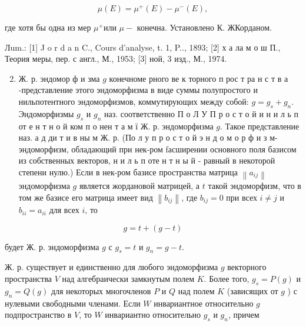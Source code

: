 \documentclass[10pt]{article}
\begin{document}
\[

\mu(E)=\mu^{+}(E)-\mu^{-}(E),

\]



где хотя бы одна из мер $\mu^{+}$или $\mu-$ конечна. Установлено К. ЖКорданом.



Лum.: [1] J o r d a n C., Cours d'analyse, t. 1, P.., 1893; [2] х а ла м о ш П., Теория меры, пер. с англ., М., 1953; [3] ной, 3 изд., М., 1974.



\begin{enumerate}

  \setcounter{enumi}{1}

  \item Ж. р. эндомор ф и зма $g$ конечноме рного ве к торного п рос т ра н с т в а -представление этого эндоморфизма в виде суммы полупростого и нильпотентного эндоморфизмов, коммутирующих между собой: $g=g_{s}+g_{n}$. Эндоморфизмы $g_{s}$ и $g_{n}$ наз. соответственно П о Л У П р о с т о й и н и л ь п от е н т н о й ком п о нен т а м ї Ж. р. эндоморфизма $g$. Такое представление наз. а д ди т и в ны м Ж. р. (По л у п р о с т о й э н д о м о р ф и з м- эндоморфизм, обладающий при нек-ром fасширении основного поля базисом из собственных векторов, н и л ь п оте н т н ы й - равный в некоторой степени нулю.) Если в нек-ром базисе пространства матрица $\left\|a_{i j}\right\|$ эндоморфизма $g$ является жордановой матрицей, а $t$ такой эндоморфизм, что в том же базисе его матрица имеет вид $\left\|b_{i j}\right\|$, где $b_{i j}=0$ при всех $i \neq j$ и $b_{i i}=a_{i i}$ для всех $i$, то

\end{enumerate}



\[

g=t+(g-t)

\]



будет Ж. р. эндоморфизма $g$ с $g_{s}=t$ и $g_{n}=g-t$.



Ж. р. существует и единственно для любого эндоморфизма $g$ векторного пространства $V$ над алгебраически замкнутым полем $K$. Более того, $g_{s}=P(g)$ и $g_{n}=Q(g)$ для некоторых многочленов $P$ и $Q$ над полем $K$ (зависящих от $g$ ) с нулевыми свободными членами. Если $W$ инвариантное относительно $g$ подпространство в $V$, то $W$ инвариантно относительно $g_{s}$ и $g_{n}$, причем
\end{document}
